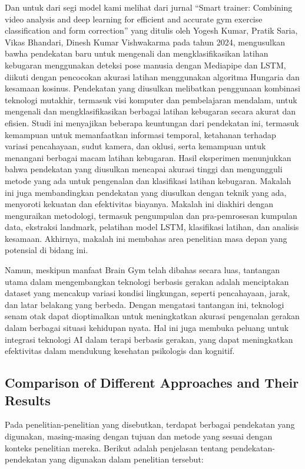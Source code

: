 \documentclass[12pt,a4paper]{article}
\begin{document}
Dan untuk dari segi model kami melihat dari jurnal “Smart trainer: Combining video analysis and deep learning for efficient and accurate gym exercise classification and form correction” yang ditulis oleh Yogesh Kumar, Pratik Saria, Vikas Bhandari, Dinesh Kumar Vishwakarma pada tahun 2024, mengusulkan bawha pendekatan baru untuk mengenali dan mengklasifikasikan latihan kebugaran menggunakan deteksi pose manusia dengan Mediapipe dan LSTM, diikuti dengan pencocokan akurasi latihan menggunakan algoritma Hungaria dan kesamaan kosinus. Pendekatan yang diusulkan melibatkan penggunaan kombinasi teknologi mutakhir, termasuk visi komputer dan pembelajaran mendalam, untuk mengenali dan mengklasifikasikan berbagai latihan kebugaran secara akurat dan efisien. Studi ini menyajikan beberapa keuntungan dari pendekatan ini, termasuk kemampuan untuk memanfaatkan informasi temporal, ketahanan terhadap variasi pencahayaan, sudut kamera, dan oklusi, serta kemampuan untuk menangani berbagai macam latihan kebugaran. Hasil eksperimen menunjukkan bahwa pendekatan yang diusulkan mencapai akurasi tinggi dan mengungguli metode yang ada untuk pengenalan dan klasifikasi latihan kebugaran. Makalah ini juga membandingkan pendekatan yang diusulkan dengan teknik yang ada, menyoroti kekuatan dan efektivitas biayanya. Makalah ini diakhiri dengan menguraikan metodologi, termasuk pengumpulan dan pra-pemrosesan kumpulan data, ekstraksi landmark, pelatihan model LSTM, klasifikasi latihan, dan analisis kesamaan. Akhirnya, makalah ini membahas area penelitian masa depan yang potensial di bidang ini.


Namun, meskipun manfaat Brain Gym telah dibahas secara luas, tantangan utama dalam mengembangkan teknologi berbasis gerakan adalah menciptakan dataset yang mencakup variasi kondisi lingkungan, seperti pencahayaan, jarak, dan latar belakang yang berbeda. Dengan mengatasi tantangan ini, teknologi senam otak dapat dioptimalkan untuk meningkatkan akurasi pengenalan gerakan dalam berbagai situasi kehidupan nyata. Hal ini juga membuka peluang untuk integrasi teknologi AI dalam terapi berbasis gerakan, yang dapat meningkatkan efektivitas dalam mendukung kesehatan psikologis dan kognitif.


\subsection{Comparison of Different Approaches and Their Results}
Pada penelitian-penelitian yang disebutkan, terdapat berbagai pendekatan yang digunakan, masing-masing dengan tujuan dan metode yang sesuai dengan konteks penelitian mereka. Berikut adalah penjelasan tentang pendekatan-pendekatan yang digunakan dalam penelitian tersebut:
\end{document}
